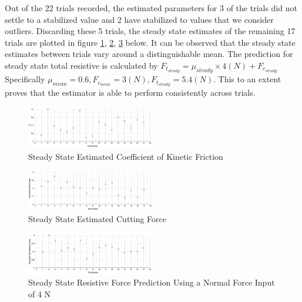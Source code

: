 \documentclass[letterpaper, 10 pt, conference]{ieeeconf}  %
\begin{document}
Out of the 22 trials recorded, the estimated parameters for 3 of the trials did not settle to a stabilized value and 2 have stabilized to values that we consider outliers. Discarding these 5 trials, the steady state estimates of the remaining 17 trials are plotted in figure \ref{fig:6}, \ref{fig:7}, \ref{fig:8} below. It can be observed that the steady state estimates between trials vary around a distinguishable mean. The prediction for steady state total resistive is calculated by $F_{t_{steady}}=\mu_{steady}\times4(N) + F_{c_{steady}}$ Specifically $\mu_{mean}=0.6, F_{c_{mean}}=3(N), F_{t_{steady}}=5.4(N)$. This to an extent proves that the estimator is able to perform consistently across trials.
 
\begin{figure}[htbp]
\begin{center}
\includegraphics[width=0.5\textwidth]{figures/mu.png}
\caption{Steady State Estimated Coefficient of Kinetic Friction}
\label{fig:6}
\end{center}
\end{figure}

\begin{figure}[htbp]
\begin{center}
\includegraphics[width=0.5\textwidth]{figures/cuttingF.png}
\caption{Steady State Estimated Cutting Force}
\label{fig:7}
\end{center}
\end{figure}

\begin{figure}[htbp]
\begin{center}
\includegraphics[width=0.5\textwidth]{figures/Ft.png}
\caption{Steady State Resistive Force Prediction Using a Normal Force Input of 4 N}
\label{fig:8}
\end{center}
\end{figure}
\end{document}
